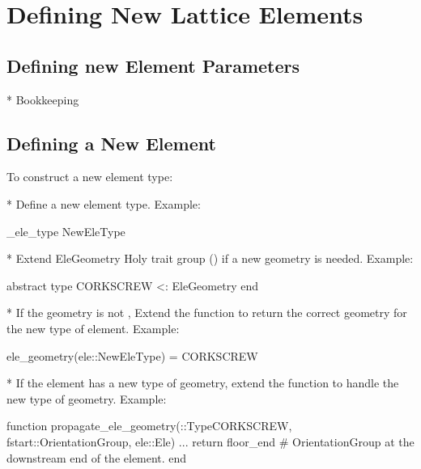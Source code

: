 \chapter{Defining New Lattice Elements}
\label{c:new.ele}

\section{Defining new Element Parameters}

* Bookkeeping 

\section{Defining a New Element}
\label{s:new.ele}

To construct a new element type:

* Define a new element type. Example:
\begin{example}
  \@construct_ele_type NewEleType
\end{example}

* Extend EleGeometry Holy trait group () if a new geometry is needed. Example:
\begin{example}
  abstract type CORKSCREW <: EleGeometry end
\end{example}

* If the geometry is not , Extend the  function to return the 
correct geometry for the new type of element. Example:
\begin{example}
  ele_geometry(ele::NewEleType) = CORKSCREW
\end{example}

* If the element has a new type of geometry, extend the  function
to handle the new type of geometry. Example:
\begin{example}
  function propagate_ele_geometry(::Type{CORKSCREW}, fstart::OrientationGroup, ele::Ele)
    ...
    return floor_end  # OrientationGroup at the downstream end of the element.
  end
\end{example}



